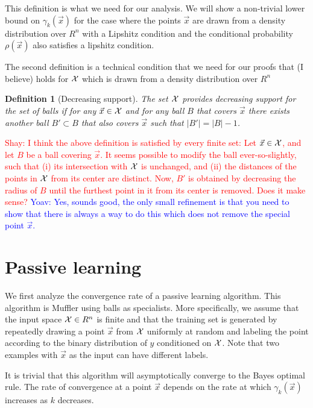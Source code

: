 \documentclass{article}
\newtheorem{definition}[theorem]{Definition}
\newcommand{\X}{{\cal X}}
\newcommand{\x}{\vec{x}}
\newcommand{\y}{\vec{y}}
\newcommand{\shay}[1]{\textcolor{red}{Shay: #1}}
\newcommand{\yoav}[1]{\textcolor{blue}{Yoav: #1}}
\begin{document}
This definition is what we need for our analysis. We will show a
non-trivial lower bound on $\gamma_k(\x)$ for the case where the
points $\x$ are drawn from a density distribution over $R^n$ with a
Lipshitz condition and the conditional probability $\rho(\x)$ also
satisfies a lipshitz condition.


The second definition is a technical condition that we need for our
proofs that (I believe) holds for $\X$ which is drawn from a density
distribution over $R^n$
\begin{definition}[Decreasing support]
The set $\X$ provides decreasing support for the set of balls if for
any $\x \in \X$ and for any ball $B$ that covers $\x$ there exists
another ball $B' \subset B$ that also covers $\x$ such that $|B'| = |B|-1$.
\end{definition}

\shay{I think the above definition is satisfied by every finite set:
Let $\x \in \X$, and let $B$ be a ball covering $\x$. 
It seems possible to modify the ball ever-so-slightly, 
such that (i) its intersection with $\X$ is unchanged,  and (ii) the 
distances of the points in $\X$ from its center are distinct.
Now, $B'$ is obtained by decreasing the radius of $B$ until
the furthest point in it from its center is removed.  Does it make sense?}
\yoav{Yes, sounds good, the only small refinement is that you need to
  show that there is always a way to do this which does not remove the
  special point $\x$.}
\iffalse
We assume that $\rho$ is Lipschitz
with parameter $\alpha$, i.e. for any two vectors $\vec{x}\neq\vec{y}$.

$$\frac{\rho(\x)-\rho(\y)}{\|\x-\y\|_2} \leq \alpha$$
\fi

\section{Passive learning}

We first analyze the convergence rate of a passive learning algorithm.
This algorithm is Muffler using balls as specialists. More
specifically, we assume that the input space $\X \in R^n$ is finite
and that the training set is generated by repeatedly drawing a point
$\x$ from $\X$ uniformly at random and labeling the point according
to the binary distribution of $y$ conditioned on $\X$. Note that two
examples with $\x$ as the input can have different labels.

It is trivial that this algorithm will asymptotically converge to the
Bayes optimal rule. The rate of convergence at a point $\x$ depends on 
the rate at which $\gamma_k(\x)$ increases as $k$ decreases.
\end{document}
